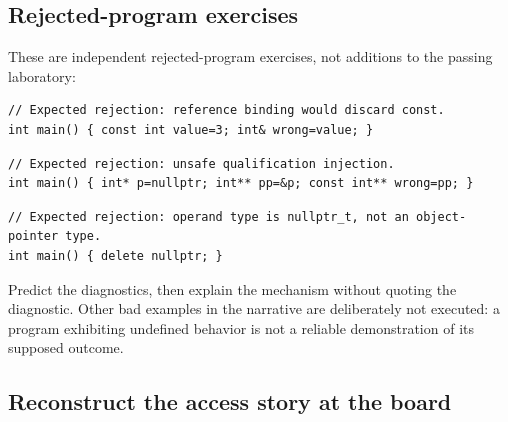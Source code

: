 \subsection{Rejected-program exercises}\label{01-foundations-i-ch004-rejected-program-exercises}

\hypertarget{01-foundations-i-ch004-rejected-program-exercises}{}

These are independent rejected-program exercises, not additions to the passing laboratory:

\begin{verbatim}
// Expected rejection: reference binding would discard const.
int main() { const int value=3; int& wrong=value; }
\end{verbatim}

\begin{verbatim}
// Expected rejection: unsafe qualification injection.
int main() { int* p=nullptr; int** pp=&p; const int** wrong=pp; }
\end{verbatim}

\begin{verbatim}
// Expected rejection: operand type is nullptr_t, not an object-pointer type.
int main() { delete nullptr; }
\end{verbatim}

Predict the diagnostics, then explain the mechanism without quoting the diagnostic. Other bad examples in the narrative are deliberately not executed: a program exhibiting undefined behavior is not a reliable demonstration of its supposed outcome.

\subsection{Reconstruct the access story at the board}\label{01-foundations-i-ch004-reconstruct-the-access-story-at-the-board}

\hypertarget{01-foundations-i-ch004-reconstruct-the-access-story-at-the-board}{}

